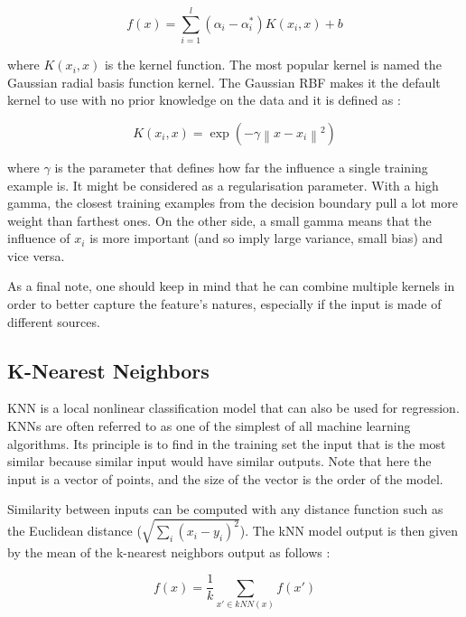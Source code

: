 \documentclass[11pt,a4paper,oneside]{book}
\begin{document}
\begin{equation}
f\left ( x \right ) = \sum_{i=1}^l \left ( \alpha_i - \alpha_i^* \right )K\left ( x_i, x \right ) + b
\end{equation}

where $K\left ( x_i, x \right )$ is the kernel function. The most popular kernel is named the Gaussian radial basis function kernel. The Gaussian RBF makes it the default kernel to use with no prior knowledge on the data and it is defined as : 

\begin{equation}
K\left ( x_i, x \right ) = \exp \left ( -\gamma \left \| x - x_i \right \|^2 \right )
\end{equation}

where $\gamma$\label{gamma} is the parameter that defines how far the influence a single training example is. It might be considered as a regularisation parameter. With a high gamma, the closest training examples from the decision boundary pull a lot more weight than farthest ones. On the other side, a small gamma means that the influence of $x_i$ is more important (and so imply large variance, small bias) and vice versa.

As a final note, one should keep in mind that he can combine multiple kernels in order to better capture the feature's natures, especially if the input is made of different sources.


\subsection{K-Nearest Neighbors}

KNN is a local nonlinear classification model that can also be used for regression. KNNs are often referred to as one of the simplest of all machine learning algorithms. Its principle is to find in the training set the input that is the most similar because similar input would have similar outputs. Note that here the input is a vector of points, and the size of the vector is the order of the model. 

Similarity between inputs can be computed with any distance function such as the Euclidean distance ($\sqrt{\sum_i \left (  x_i - y_i \right )^{2}}$). The kNN model output is then given by the mean of the k-nearest neighbors output as follows :


\begin{equation}
f\left ( x \right ) = \frac{1}{k}\sum_{x' \in kNN(x) } f\left ( x' \right )
\end{equation}
\end{document}
